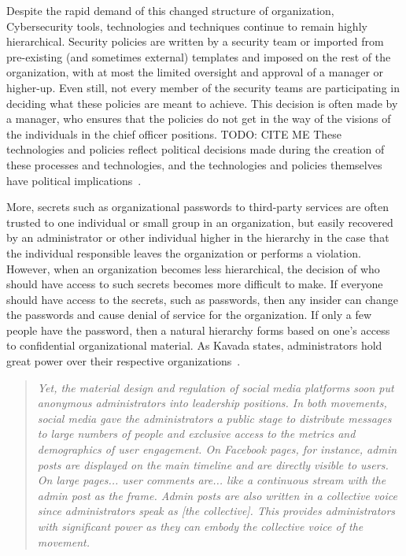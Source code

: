 Despite the rapid demand of this changed structure of organization, 
Cybersecurity tools, technologies and techniques continue to remain highly 
hierarchical. Security policies are written by a security team or imported from
pre-existing (and sometimes external) templates and imposed on the rest of the
organization, with at most the limited oversight and approval of a manager or
higher-up. Even still, not every member of the security teams are participating
in deciding what these policies are meant to achieve. This decision is often
made by a manager, who ensures that the policies do not get in the way of the
visions of the individuals in the chief officer positions. {\color{red}TODO: CITE ME} These technologies
and policies reflect political decisions made during the creation of these
processes and technologies, and the technologies and policies themselves have
political implications~\cite{winner1980artifacts}.

More, secrets such as organizational passwords to third-party services are often
trusted to one individual or small group in an organization, but easily
recovered by an administrator or other individual higher in the hierarchy in the
case that the individual responsible leaves the organization or performs a
violation. However, when an organization becomes less hierarchical, the decision
of who should have access to such secrets becomes more difficult to make. If
everyone should have access to the secrets, such as passwords, then any insider
can change the passwords and cause denial of service for the organization. If
only a few people have the password, then a natural hierarchy forms based on
one's access to confidential organizational material. As Kavada states,
administrators hold great power over their respective
organizations~\cite{kavada2020counterpublics}.

\begin{quotation}
\textit{Yet, the material design and regulation of social media platforms soon
put anonymous administrators into leadership positions. In both movements,
social media gave the administrators a public stage to distribute messages to
large numbers of people and exclusive access to the metrics and demographics of
user engagement. On Facebook pages, for instance, admin posts are displayed on
the main timeline and are directly visible to users. On large pages... user
comments are... like a continuous stream with the admin post as the frame. Admin
posts are also written in a collective voice since administrators speak as [the
collective]. This provides administrators with significant power as they can
embody the collective voice of the movement.}
\end{quotation}

